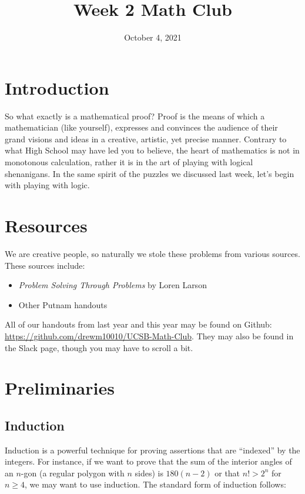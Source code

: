 \documentclass{article}
\title{Week 2 Math Club}
\author{}
\date{October 4, 2021}
\begin{document}
\section{Introduction}
    So what exactly is a mathematical proof? Proof is the means of which a mathematician (like yourself), expresses and convinces the audience of their grand visions and ideas in a creative, artistic, yet precise manner. Contrary to what High School may have led you to believe, the heart of mathematics is not in monotonous calculation, rather it is in the art of playing with logical shenanigans. In the same spirit of 
    the puzzles we discussed last week, let's begin with playing with logic. 


\section{Resources}

We are creative people, so naturally we stole these problems from various sources.
These sources include:
\begin{itemize}
    \item {\it Problem Solving Through Problems} by Loren Larson
    \item Other Putnam handouts
\end{itemize}
All of our handouts from last year and this year may be found on Github: \url{https://github.com/drewm10010/UCSB-Math-Club}.
They may also be found in the Slack page, though you may have to scroll a bit.

\section{Preliminaries}

\subsection{Induction}

Induction is a powerful technique for proving assertions that are ``indexed'' by the integers. For instance, if we want to prove that the sum of the interior angles of an \(n\)-gon (a regular polygon with $n$ sides) is \(180(n-2)\) or that \(n!>2^n\) for \(n\geq 4\), we may want to use induction. The standard form of induction follows: 
\end{document}
